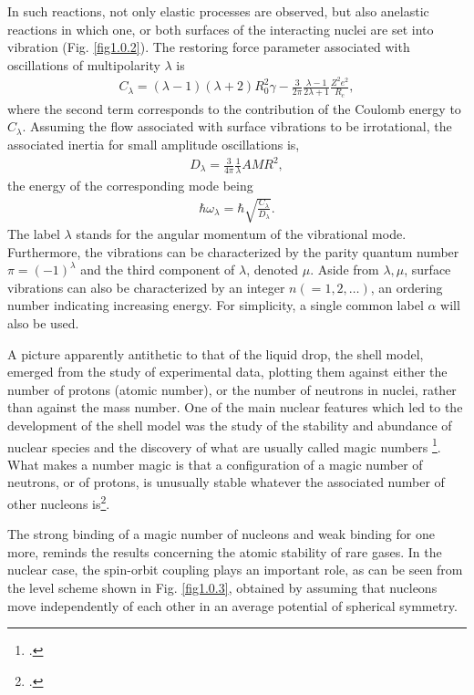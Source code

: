 In such reactions, not only elastic processes are observed, but also anelastic reactions in which one, or both  surfaces of the interacting nuclei are set into vibration (Fig. \ref{fig1.0.2}). The restoring force parameter associated with oscillations of multipolarity $\lambda$ is 
\begin{align}\label{eq1.0.4b}
C_\lambda=(\lambda-1)(\lambda+2)R_0^2\gamma-\frac{3}{2\pi}\frac{\lambda-1}{2\lambda+1}\frac{Z^2e^2}{R_c},
\end{align}
where the second term corresponds to the contribution of the Coulomb energy to $C_\lambda$. Assuming the flow associated with surface vibrations to be irrotational, the associated inertia for small amplitude oscillations is, 
\begin{align}\label{eq1.0.5}
D_{\lambda}=\frac{3}{4\pi}\frac{1}{\lambda}AMR^2,
\end{align}
the energy of the corresponding mode being
\begin{align}\label{eq1.0.6}
\hbar\omega_\lambda=\hbar\sqrt{\frac{C_\lambda}{D_\lambda}}.
\end{align}
The label $\lambda$ stands for the angular momentum of the vibrational mode. Furthermore, the vibrations can be characterized by the parity quantum number $\pi=(-1)^\lambda$ and the third component of $\lambda$, denoted $\mu$. Aside from $\lambda,\mu$, surface vibrations can also be characterized by an integer $n(=1,2,\dots)$, an ordering number indicating increasing energy. For simplicity, a single common label $\alpha$ will  also be used.



A picture apparently antithetic to that of the liquid drop, the shell model, emerged from the study of experimental data, plotting them against either the number of protons (atomic number), or the number of neutrons in  nuclei, rather than against the mass number.
One of the main nuclear features which led to the development of the shell model was the study of the stability and abundance of nuclear species and the discovery of what are usually called magic numbers \footnote{\cite{Elsasser:33,Mayer:48,Haxel:49}.}. What makes a number magic is that a configuration of a magic number of neutrons, or of protons, is unusually stable whatever the associated number of other nucleons is\footnote{\cite{Mayer:49,Mayer:49b}.}.


The strong binding of a magic number of nucleons and weak binding for one more, reminds the results  concerning the atomic stability of rare gases. In the nuclear case,  the spin-orbit coupling plays an important role, as can be seen from the level scheme shown in Fig. \ref{fig1.0.3}, obtained by assuming that nucleons move independently of each other in an average potential  of  spherical symmetry.


